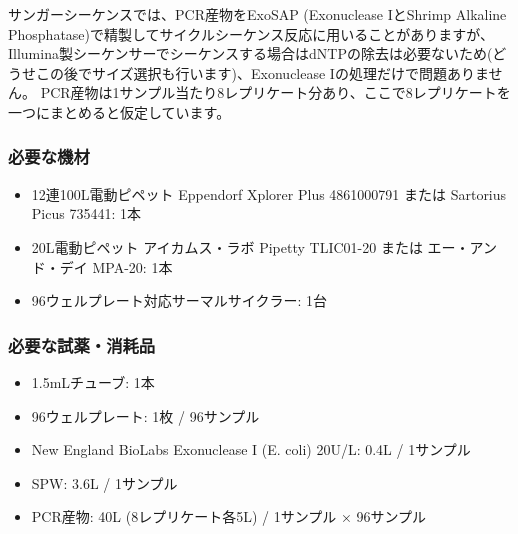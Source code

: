 \documentclass[titlepage,10pt,a4paper,uplatex]{jsbook}
\begin{document}
サンガーシーケンスでは、PCR産物をExoSAP (Exonuclease IとShrimp Alkaline Phosphatase)で精製してサイクルシーケンス反応に用いることがありますが、Illumina製シーケンサーでシーケンスする場合はdNTPの除去は必要ないため(どうせこの後でサイズ選択も行います)、Exonuclease Iの処理だけで問題ありません。
PCR産物は1サンプル当たり8レプリケート分あり、ここで8レプリケートを一つにまとめると仮定しています。

\subsubsection{必要な機材}
\begin{itemize}
\item 12連100{\textmu}L電動ピペット Eppendorf Xplorer Plus 4861000791 または Sartorius Picus 735441: 1本
\item 20{\textmu}L電動ピペット アイカムス・ラボ Pipetty TLIC01-20 または エー・アンド・デイ MPA-20: 1本
\item 96ウェルプレート対応サーマルサイクラー: 1台
\end{itemize}

\subsubsection{必要な試薬・消耗品}
\begin{itemize}
\item 1.5mLチューブ: 1本
\item 96ウェルプレート: 1枚 / 96サンプル
\item New England BioLabs Exonuclease I (E. coli) 20U/{\textmu}L: 0.4{\textmu}L / 1サンプル
\item SPW: 3.6{\textmu}L / 1サンプル
\item PCR産物: 40{\textmu}L (8レプリケート各5{\textmu}L) / 1サンプル × 96サンプル
\end{itemize}
\end{document}
